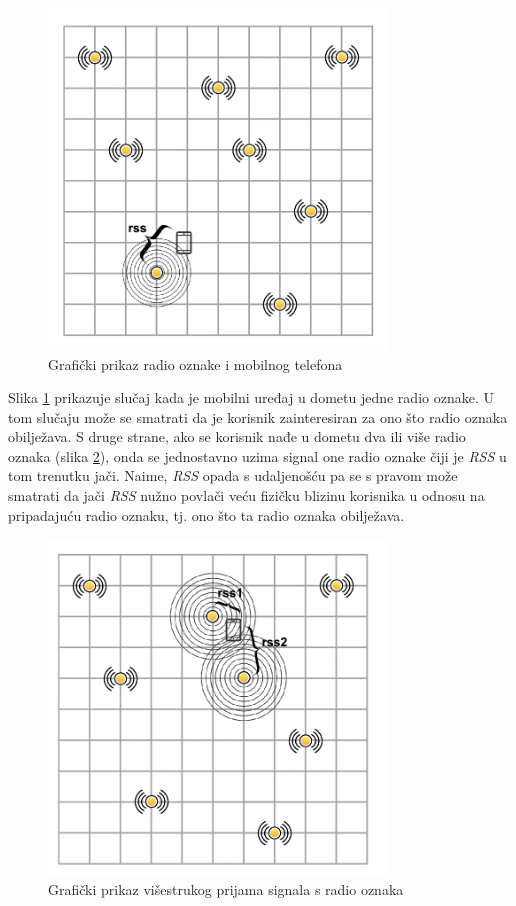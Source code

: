\documentclass[times, utf8, diplomski, numeric]{fer}
\begin{document}
\begin{figure}[!htb]
	\centering
	\includegraphics[width=9cm]{images/gridbeacons1cell.png}
	\caption{Grafički prikaz radio oznake i mobilnog telefona}
	\label{fig:RssOneCell}
\end{figure}

Slika \ref{fig:RssOneCell} prikazuje slučaj kada je mobilni
uređaj u dometu jedne radio oznake. U tom slučaju može se smatrati da je
korisnik zainteresiran za ono što radio oznaka obilježava. S druge strane,
ako se korisnik nađe u dometu dva ili više radio oznaka (slika
\ref{fig:RssTwoCells}), onda se jednostavno uzima signal one radio oznake čiji
je \emph{RSS} u tom trenutku jači. Naime, \emph{RSS} opada s udaljenošću pa se s
pravom može smatrati da jači \emph{RSS} nužno povlači veću fizičku blizinu
korisnika u odnosu na pripadajuću radio oznaku, tj. ono što ta radio oznaka
obilježava.

\begin{figure}[!htb]
	\centering
	\includegraphics[width=9cm]{images/gridbeacons2cells.png}
	\caption{Grafički prikaz višestrukog prijama signala s radio oznaka}
	\label{fig:RssTwoCells}
\end{figure}
\end{document}
